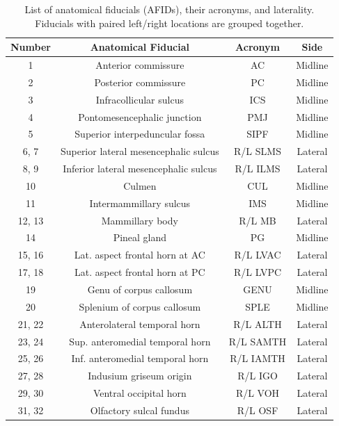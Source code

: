 \begin{table}[ht]
\caption{List of anatomical fiducials (AFIDs), their acronyms, and laterality. Fiducials with paired left/right locations are grouped together.}
\centering
\begin{tabular}{cccc}
\toprule
\textbf{Number} & \textbf{Anatomical Fiducial} & \textbf{Acronym} & \textbf{Side} \\
\midrule
1         & Anterior commissure                      & AC          & Midline \\
2         & Posterior commissure                     & PC          & Midline \\
3         & Infracollicular sulcus                   & ICS         & Midline \\
4         & Pontomesencephalic junction              & PMJ         & Midline \\
5         & Superior interpeduncular fossa           & SIPF        & Midline \\
6, 7      & Superior lateral mesencephalic sulcus    & R/L SLMS    & Lateral \\
8, 9      & Inferior lateral mesencephalic sulcus    & R/L ILMS    & Lateral \\
10        & Culmen                                   & CUL         & Midline \\
11        & Intermammillary sulcus                   & IMS         & Midline \\
12, 13    & Mammillary body                          & R/L MB      & Lateral \\
14        & Pineal gland                             & PG          & Midline \\
15, 16    & Lat. aspect frontal horn at AC           & R/L LVAC    & Lateral \\
17, 18    & Lat. aspect frontal horn at PC           & R/L LVPC    & Lateral \\
19        & Genu of corpus callosum                  & GENU        & Midline \\
20        & Splenium of corpus callosum              & SPLE        & Midline \\
21, 22    & Anterolateral temporal horn              & R/L ALTH    & Lateral \\
23, 24    & Sup. anteromedial temporal horn          & R/L SAMTH   & Lateral \\
25, 26    & Inf. anteromedial temporal horn          & R/L IAMTH   & Lateral \\
27, 28    & Indusium griseum origin                  & R/L IGO     & Lateral \\
29, 30    & Ventral occipital horn                   & R/L VOH     & Lateral \\
31, 32    & Olfactory sulcal fundus                  & R/L OSF     & Lateral \\
\bottomrule
\end{tabular}
\label{tab:afid_list}
\end{table}
